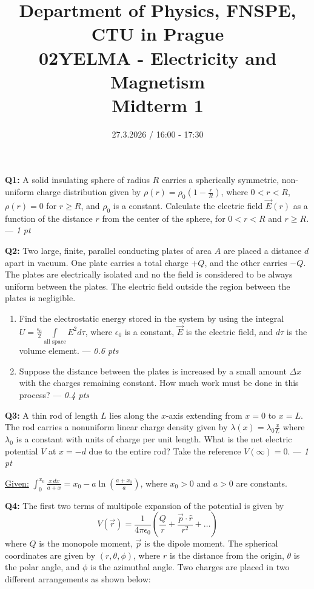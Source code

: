 \documentclass[a4paper,12pt]{article}
\title{{\large Department of Physics, FNSPE, CTU in Prague} \\
                  02YELMA - Electricity and Magnetism \\ 
          {\Large \textbf{Midterm 1}}\vspace{-1cm}}
\date{27.3.2026 / 16:00 - 17:30}
\author{}
\begin{document}
\maketitle

\textbf{Q1:} A solid insulating sphere of radius $R$ carries a spherically symmetric, non-uniform charge distribution given by $\rho(r) = \rho_0 \left(1 - \frac{r}{R}\right)$, where $0 < r < R$, $\rho(r)=0$ for $r \geq R$, and $\rho_0$ is a constant. Calculate the electric field $\vec{E}(r)$ as a function of the distance $r$ from the center of the sphere, for $0 < r < R$ and $r \geq R$. --- \textit{1 pt}

\vspace*{0.3cm}
\textbf{Q2:} Two large, finite, parallel conducting plates of area $A$ are placed a distance $d$ apart in vacuum. One plate carries a total charge $+Q$, and the other carries $-Q$. The plates are electrically isolated and no the field is considered to be always uniform between the plates. The electric field outside the region between the plates is negligible.

\begin{enumerate}
    \item[(a)] Find the electrostatic energy stored in the system by using the integral $U = \frac{\epsilon_0}{2} \int\limits_{\text{all space}}  E^2 d\tau$, where $\epsilon_0$ is a constant, $\vec{E}$ is the electric field, and $d\tau$ is the volume element. --- \textit{0.6 pts}
    \item[(b)] Suppose the distance between the plates is increased by a small amount $\Delta x$ with the charges remaining constant. How much work must be done in this process? --- \textit{0.4 pts}
\end{enumerate}

\vspace*{0.3cm}
\textbf{Q3:} A thin rod of length $L$ lies along the $x$-axis extending from $x = 0$ to $x = L$. The rod carries a nonuniform linear charge density given by $\lambda(x) = \lambda_0 \frac{x}{L}$
where $\lambda_0$ is a constant with units of charge per unit length.  What is the net electric potential $V$ at $x=-d$ due to the entire rod? Take the reference $V(\infty)=0$. --- \textit{1 pt}

\underline{Given:} $\int_{0}^{x_0} \frac{x \, dx}{a+x} = x_0 - a \ln\left(\frac{a+x_0}{a}\right)$, where $x_0>0$ and $a>0$ are constants.

\vspace*{0.3cm}
\textbf{Q4:} The first two terms of multipole expansion of the potential is given by 
\begin{equation*}
    V(\vec{r}) = \frac{1}{4\pi\epsilon_0} \left( \frac{Q}{r} + \frac{\vec{p}\cdot\hat{r}}{r^2} + \hdots \right)
\end{equation*}
where $Q$ is the monopole moment, $\vec{p}$ is the dipole moment. The spherical coordinates are given by $(r,\theta,\phi)$, where $r$ is the distance from the origin, $\theta$ is the polar angle, and $\phi$ is the azimuthal angle. Two charges are placed in two different arrangements as shown below: 
\end{document}
